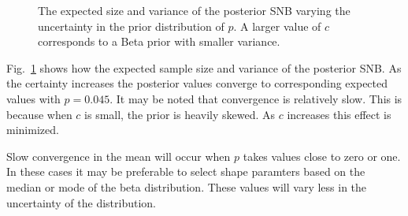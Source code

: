 \documentclass[review]{elsarticle}
\begin{document}
\begin{figure}[t!]
\centering
{}
\hfill
{}
\caption{
The expected size and variance of the posterior SNB varying the uncertainty 
in the prior distribution of $p$. A larger value of $c$
corresponds to a Beta prior with smaller variance.
}
\label{fig:bayesian-sample-size}
\end{figure}

Fig.~\ref{fig:bayesian-sample-size} shows how the expected sample size
and variance of the posterior SNB. As the certainty increases the 
posterior values converge to corresponding expected values with 
$p = 0.045$. It may be noted that convergence is relatively slow. This
is because when $c$ is small, the prior is heavily skewed. As $c$ increases
this effect is minimized.

Slow convergence in the mean will occur when $p$ takes values close to 
zero or one. In these cases it may be preferable to select shape paramters
based on the median or mode of the beta distribution. These values
will vary less in the uncertainty of the distribution.
\end{document}
